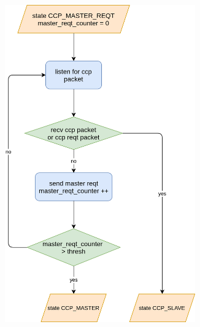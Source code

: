 \documentclass[\main/main.tex]{subfiles}
\begin{document}


\begin{figure}
    \centering
    \begin{subfigure}[b]{0.47\textwidth}
        \begin{center}
            \includegraphics[width=0.9\textwidth]{ccp_master_reqt_flow_chart.png}

\end{center}
\end{subfigure}
\end{figure}
\end{document}
